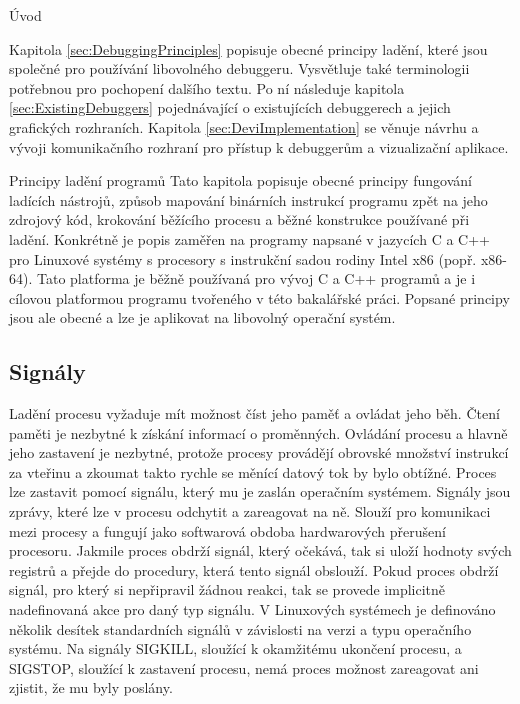 \documentclass[czech,bachelor,male,python,dept460,hidelinks]{diploma}						%
\newcommand{\parspace}[1][]{
	\ifthenelse{\isempty{#1}}{\vspace{5mm}}{\vspace{#1}}
	\par
}
\begin{document}
\begin{section}{Úvod}
	\parspace Kapitola \ref{sec:DebuggingPrinciples} popisuje obecné principy ladění, které jsou společné pro používání libovolného debuggeru.
	Vysvětluje také terminologii potřebnou pro pochopení dalšího textu. Po ní následuje kapitola \ref{sec:ExistingDebuggers} pojednávající o existujících
	debuggerech a jejich grafických rozhraních. Kapitola \ref{sec:DeviImplementation} se věnuje návrhu a vývoji komunikačního rozhraní pro přístup k debuggerům
	a vizualizační aplikace.
\end{section}
\begin{section}{Principy ladění programů}
\label{sec:DebuggingPrinciples}
	Tato kapitola popisuje obecné principy fungování ladících nástrojů, způsob mapování binárních instrukcí programu zpět na jeho zdrojový kód,
	krokování běžícího procesu a běžné konstrukce používané při ladění. Konkrétně je popis zaměřen na programy napsané v jazycích C a C++
	pro Linuxové systémy s procesory s instrukční sadou rodiny Intel x86 (popř. x86-64).
	Tato platforma je běžně používaná pro vývoj C a C++ programů a je i cílovou platformou programu tvořeného v této bakalářské práci.
	Popsané principy jsou ale obecné a lze je aplikovat na libovolný operační systém.
		
	\subsection{Signály}
		Ladění procesu vyžaduje mít možnost číst jeho paměť a ovládat jeho běh. Čtení paměti je nezbytné k získání informací o proměnných.
		Ovládání procesu a hlavně jeho zastavení je nezbytné, protože procesy provádějí obrovské množství instrukcí za vteřinu a
		zkoumat takto rychle se měnící datový tok by bylo obtížné. Proces lze zastavit pomocí signálu, který mu je zaslán operačním systémem.
		Signály jsou zprávy, které lze v procesu odchytit a zareagovat na ně. \cite[21]{tanenbaum}
		Slouží pro komunikaci mezi procesy a fungují jako softwarová obdoba hardwarových přerušení procesoru.
		Jakmile proces obdrží signál, který očekává, tak si uloží hodnoty svých registrů a přejde do procedury, která tento signál obslouží.
		Pokud proces obdrží signál, pro který si nepřipravil žádnou reakci, tak se provede implicitně nadefinovaná akce pro daný typ signálu.
		V Linuxových systémech je definováno několik desítek standardních signálů v závislosti na verzi a typu operačního systému.
		Na signály SIGKILL, sloužící k okamžitému ukončení procesu, a SIGSTOP, sloužící k zastavení procesu, nemá proces možnost zareagovat ani
		zjistit, že mu byly poslány.
	

\end{section}
\end{document}

